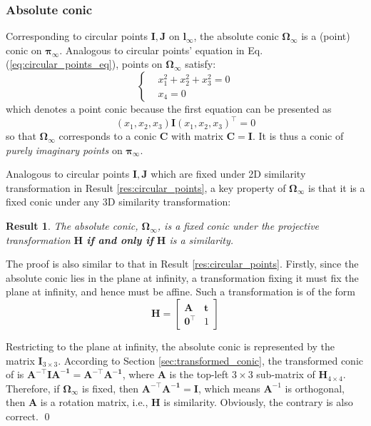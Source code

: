 \documentclass[12pt]{article}
\newtheorem{result}{Result}[section]
\numberwithin{equation}{section}
\renewenvironment{proof}{{\bfseries Proof.}}{\qed \\}
\begin{document}
\subsubsection{Absolute conic}

Corresponding to circular points $\mathbf{I, J}$ on $\mathbf{l}_{\infty}$, the absolute conic $\bm{\Omega}_{\infty}$ is a (point) conic on $\bm{\pi}_{\infty}$. Analogous to circular points' equation in Eq. (\ref{eq:circular_points_eq}), points on $\bm{\Omega}_{\infty}$ satisfy:
\begin{equation}
\begin{cases}
& x_1^2 + x_2^2 + x_3^2 = 0 \\
& x_4 = 0
\end{cases}
\label{eq:absolute_conic_eq}
\end{equation}
which denotes a point conic because the first equation can be presented as
\begin{equation*}
(x_1, x_2, x_3) \mathbf{I} (x_1, x_2, x_3)^\top = 0
\end{equation*}
so that $\bm{\Omega}_{\infty}$ corresponds to a conic $\mathbf{C}$ with matrix $\mathbf{C = I}$. It is thus a conic of \textit{purely imaginary points} on $\bm{\pi}_{\infty}$.

Analogous to circular points $\mathbf{I, J}$ which are fixed under 2D similarity transformation in Result \ref{res:circular_points}, a key property of $\bm{\Omega}_{\infty}$ is that it is a fixed conic under any 3D similarity transformation: \\

\begin{result}
The absolute conic, $\bm{\Omega}_{\infty}$, is a fixed conic under the projective transformation $\mathbf{H}$ \textbf{if and only if} $\mathbf{H}$ is a similarity.
\label{res:absolute_conic}
\end{result}
\begin{proof}
The proof is also similar to that in Result \ref{res:circular_points}. Firstly, since the absolute conic lies in the plane at infinity, a transformation fixing it
must fix the plane at infinity, and hence must be affine. Such a transformation is of the form
\begin{equation*}
\mathbf{H} = 
\begin{bmatrix}
\mathbf{A} & \mathbf{t} \\
\mathbf{0}^\top & 1
\end{bmatrix}
\end{equation*}

Restricting to the plane at infinity, the absolute conic is represented by the matrix $\mathbf{I}_{3\times 3}$. According to Section \ref{sec:transformed_conic}, the transformed conic of is $\mathbf{\mathbf{A}^{-\top}\mathbf{IA}^{-1}} = \mathbf{\mathbf{A}^{-\top}\mathbf{A}^{-1}}$, where $\mathbf{A}$ is the top-left $3 \times 3$ sub-matrix of $\mathbf{H}_{4\times 4}$. Therefore, if $\bm{\Omega}_{\infty}$ is fixed, then $\mathbf{\mathbf{A}^{-\top}\mathbf{A}^{-1}} = \mathbf{I}$, which means $\mathbf{A}^{-1}$ is orthogonal, then $\mathbf{A}$ is a rotation matrix, i.e., $\mathbf{H}$ is similarity. Obviously, the contrary is also correct.
\end{proof}
\end{document}

